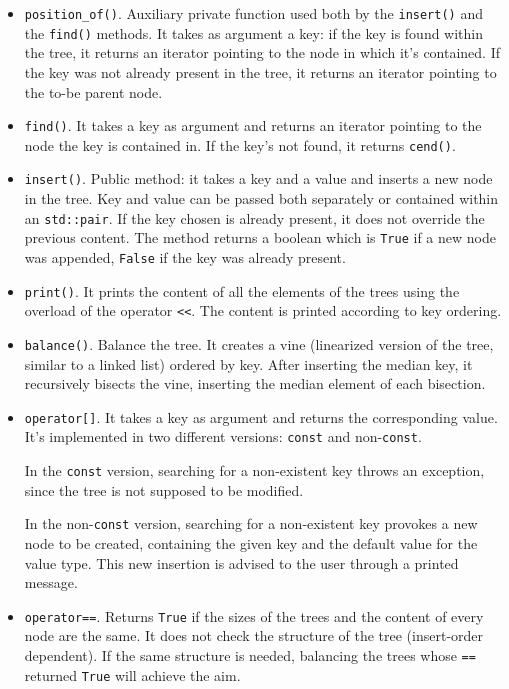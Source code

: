 \documentclass[12pt,a4paper,openany]{scrartcl}
\begin{document}
\begin{itemize}
    \item \texttt{position\_of()}. Auxiliary private function used both by the \texttt{insert()} and the \texttt{find()} methods. It takes as argument a key: if the key is found within the tree, it returns an iterator pointing to the node in which it's contained. If the key was not already present in the tree, it returns an iterator pointing to the to-be parent node.
    \item \texttt{find()}. It takes a key as argument and returns an iterator pointing to the node the key is contained in. If the key's not found, it returns \texttt{cend()}.
    \item \texttt{insert()}. Public method: it takes a key and a value and inserts a new node in the tree. Key and value can be passed both separately or contained within an \texttt{std::pair}. If the key chosen is already present, it does not override the previous content. The method returns a boolean which is \texttt{True} if a new node was appended, \texttt{False} if the key was already present.
    \item \texttt{print()}. It prints the content of all the elements of the trees using the overload of the operator \texttt{<<}. The content is printed according to key ordering.
    \item \texttt{balance()}. Balance the tree. It creates a vine (linearized version of the tree, similar to a linked list) ordered by key. After inserting the median key, it recursively bisects the vine, inserting the median element of each bisection.
    \item \texttt{operator[]}. It takes a key as argument and returns the corresponding value. It's implemented in two different versions: \texttt{const} and non-\texttt{const}.
    
    In the \texttt{const} version, searching for a non-existent key throws an exception, since the tree is not supposed to be modified.
    
    In the non-\texttt{const} version, searching for a non-existent key provokes a new node to be created, containing the given key and the default value for the value type. This new insertion is advised to the user through a printed message.
    
    \item \texttt{operator==}. Returns \texttt{True} if the sizes of the trees and the content of every node are the same. It does not check the structure of the tree (insert-order dependent). If the same structure is needed, balancing the trees whose \texttt{==} returned \texttt{True} will achieve the aim.
\end{itemize}
\end{document}
